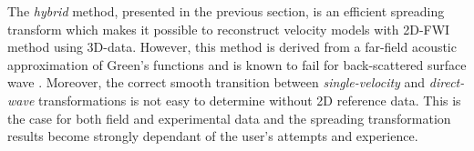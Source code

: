 \documentclass[manuscript,revised]{geophysics}
\begin{document}






\noindent The \textit{hybrid} method, presented in the previous section, is an efficient spreading transform which makes it possible to reconstruct velocity models with 2D-FWI method using 3D-data. However, this method is derived from a far-field acoustic approximation of Green's functions and is known to fail for back-scattered surface wave \citep{Schafer_LSS_2014}. Moreover, the correct smooth transition between \textit{single-velocity} and \textit{direct-wave} transformations is not easy to determine without 2D reference data. This is the case for both field and experimental data and the spreading transformation results become strongly dependant of the user's attempts and experience.
 
\end{document}
